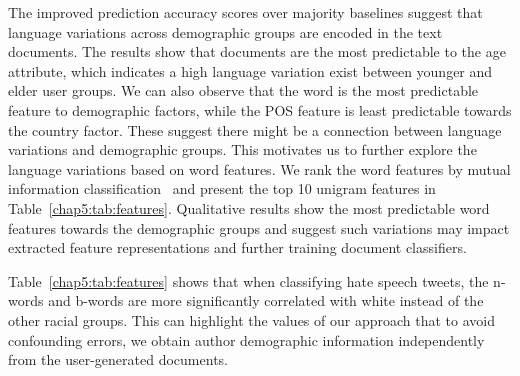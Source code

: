 The improved prediction accuracy scores over majority baselines suggest that language variations across demographic groups are encoded in the text documents. 
The results show that documents are the most predictable to the age attribute, which indicates a high language variation exist between younger and elder user groups.
We can also observe that the word is the most predictable feature to demographic factors,
while the POS feature is least predictable towards the country factor.
These suggest there might be a connection between language variations and demographic groups.
This motivates us to further explore the language variations based on word features.
We rank the word features by mutual information classification~\cite{pedregosa2011scikit} and present the top 10 unigram features in Table~\ref{chap5:tab:features}.
Qualitative results show the most predictable word features towards the demographic groups and 
suggest such variations may impact extracted feature representations and further training document classifiers.


\begin{table}[tb!]
\centering
{}
\caption{Top 10 predictable features of race and gender.}
\label{chap5:tab:features}
\end{table}

Table~\ref{chap5:tab:features} shows that when classifying hate speech tweets, the n-words and b-words are more significantly correlated with white instead of the other racial groups.
This can highlight the values of our approach that to avoid confounding errors, we obtain author demographic information independently from the user-generated documents.


